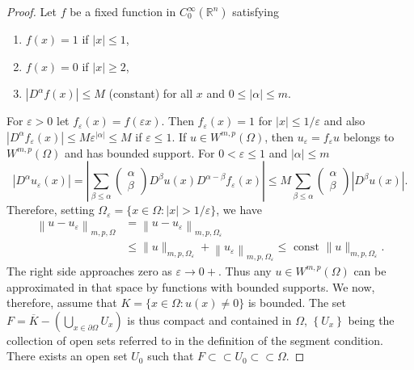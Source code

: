 \begin{proof}
  Let $f$ be a fixed function in $C_0^{\infty}\left(\mathbb{R}^n\right)$ satisfying
  \begin{enumerate}[label = (\roman*)]
    \item $f(x)=1$ if $|x| \leq 1$,
    \item $f(x)=0$ if $|x| \geq 2$,
    \item $\left|D^\alpha f(x)\right| \leq M$ (constant) for all $x$ and $0 \leq|\alpha| \leq m$.
  \end{enumerate}
  For $\varepsilon>0$ let $f_\varepsilon(x)=f(\varepsilon x)$.
  Then $f_\varepsilon(x)=1$ for $|x| \leq 1 / \varepsilon$
  and also $\left|D^\alpha f_\varepsilon(x)\right| \leq M \varepsilon^{|\alpha|} \leq M$
  if $\varepsilon \leq 1$. If $u \in W^{m, p}(\Omega)$, then $u_\varepsilon=f_\varepsilon u$
  belongs to $W^{m,p}(\Omega)$ and has bounded support.
  For $0<\varepsilon \leq 1$ and $|\alpha| \leq m$
  \[
  \left|D^\alpha u_\varepsilon(x)\right|=\left|\sum_{\beta \leq \alpha}\left(\begin{array}{c}
  \alpha \\
  \beta
  \end{array}\right) D^\beta u(x) D^{\alpha-\beta} f_\varepsilon(x)\right| \leq M \sum_{\beta \leq \alpha}\left(\begin{array}{c}
  \alpha \\
  \beta
  \end{array}\right)\left|D^\beta u(x)\right| .
  \]
  Therefore, setting $\Omega_\varepsilon=\{x \in \Omega:|x|>1 / \varepsilon\}$, we have
  \[
  \begin{aligned}
  \left\|u-u_\varepsilon\right\|_{m, p, \Omega} & =\left\|u-u_\varepsilon\right\|_{m, p, \Omega_\varepsilon} \\
  & \leq\|u\|_{m, p, \Omega_\varepsilon}+\left\|u_\varepsilon\right\|_{m, p, \Omega_\varepsilon} \leq \text { const }\|u\|_{m, p, \Omega_\varepsilon} .
  \end{aligned}
  \]
  The right side approaches zero as $\varepsilon \rightarrow 0+$.
  Thus any $u \in W^{m, p}(\Omega)$ can be approximated in that space by functions
  with bounded supports.
  We now, therefore, assume that $K=\{x \in \Omega: u(x) \neq 0\}$ is bounded.
  The set $F=\overline{K}-\left(\bigcup_{x \in\partial\Omega} U_x\right)$
  is thus compact and contained in $\Omega$, $\left\{U_x\right\}$
  being the collection of open sets 
  referred to in the definition of the segment condition.
  There exists an open set $U_0$ such that $F \subset\subset U_0 \subset\subset \Omega$.

\end{proof}
